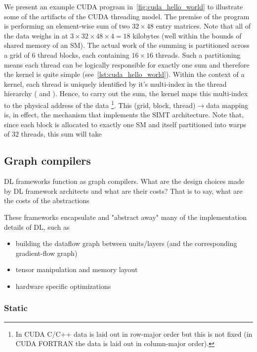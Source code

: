 \documentclass[sigconf]{acmart}
\begin{document}


We present an example CUDA program in~\cref{fig:cuda_hello_world} to illustrate some of the artifacts of the CUDA threading model.
The premise of the program is performing an element-wise sum of two $32 \times 48$ entry matrices.
Note that all of the data weighs in at  $3 \times 32 \times 48 \times 4 = 18$ kilobytes (well within the bounds of shared memory of an SM).
The actual work of the summing is partitioned across a grid of 6 thread blocks, each containing $16 \times 16$ threads.
Such a partitioning means each thread can be logically responsible for exactly one sum and therefore the kernel is quite simple (see~\cref{lst:cuda_hello_world}).
Within the context of a kernel, each thread is uniquely identified by it's multi-index in the thread hierarchy ( and ).
Hence, to carry out the sum, the kernel maps this multi-index to the physical address of the data%
\footnote{In CUDA C/C++ data is laid out in row-major order but this is not fixed (in CUDA FORTRAN the data is laid out in column-major order).}.
This (grid, block, thread)$\rightarrow$data mapping is, in effect, the mechanism that implements the SIMT architecture.
Note that, since each block is allocated to exactly one SM and itself partitioned into warps of 32 threads, this sum will take 







\subsection{Graph compilers}\label{subsec:graph-compilers}

DL frameworks function as graph compilers.
What are the design choices made by DL framework architects and what are their costs?
That is to say, what are the costs of the abstractions

These frameworks encapsulate and "abstract away" many of the implementation details of DL, such as
\begin{itemize}
  \item building the dataflow graph between units/layers (and the corresponding gradient-flow graph)
  \item tensor manipulation and memory layout
  \item hardware specific optimizations
\end{itemize}

\subsubsection{Static}
\end{document}
